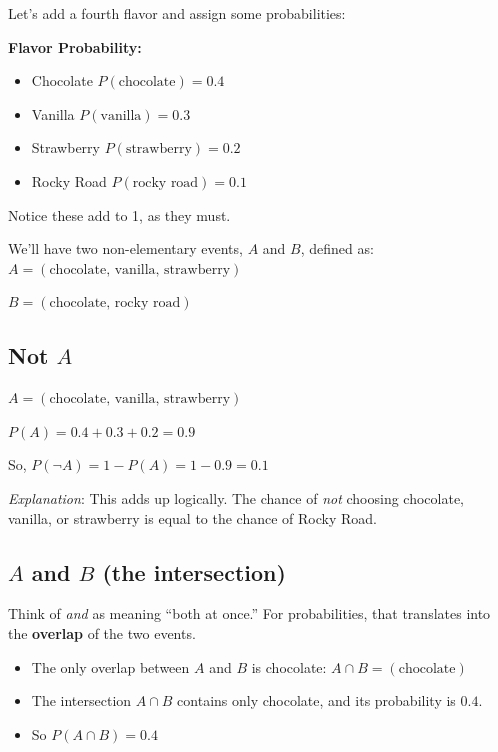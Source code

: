 \documentclass[
  letterpaper,
  DIV=11,
  numbers=noendperiod]{scrreprt}
\begin{document}
Let's add a fourth flavor and assign some probabilities:

\textbf{Flavor Probability:}

\begin{itemize}
\item
  Chocolate \(P(\text{chocolate})=0.4\)
\item
  Vanilla \(P(\text{vanilla})=0.3\)
\item
  Strawberry \(P(\text{strawberry})=0.2\)
\item
  Rocky Road \(P(\text{rocky road})=0.1\)
\end{itemize}

Notice these add to 1, as they must.

We'll have two non-elementary events, \(A\) and \(B\), defined as:\\

\(A = (\text{chocolate, vanilla, strawberry})\)

\(B = (\text{chocolate, rocky road})\)

\subsection{\texorpdfstring{\textbf{Not} \(A\)}{Not A}}\label{not-a}

\(A = (\text{chocolate, vanilla, strawberry})\)

\(P(A) = 0.4 + 0.3 + 0.2 = 0.9\)

So, \(P(\neg A) = 1 - P(A) = 1 - 0.9 = 0.1\)

\emph{Explanation}: This adds up logically. The chance of \emph{not}
choosing chocolate, vanilla, or strawberry is equal to the chance of
Rocky Road.

\subsection{\texorpdfstring{\(A\) \textbf{and} \(B\) (the
intersection)}{A and B (the intersection)}}\label{a-and-b-the-intersection}

Think of \emph{and} as meaning ``both at once.'' For probabilities, that
translates into the \textbf{overlap} of the two events.

\begin{itemize}
\item
  The only overlap between \(A\) and \(B\) is chocolate:
  \(A \cap B = (\text{chocolate})\)
\item
  The intersection \(A \cap B\) contains only chocolate, and its
  probability is \(0.4\).
\item
  So \(P(A \cap B) = 0.4\)
\end{itemize}
\end{document}
